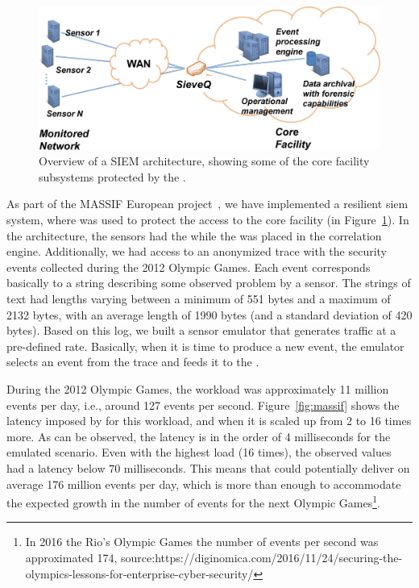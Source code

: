 \begin{figure}[!h]
\centering
\includegraphics[width=0.65\columnwidth]{images/images/SIEM.pdf}
\caption{Overview of a SIEM architecture, showing some of the core facility subsystems protected by the \sieveq.}
\label{fig:siem}
\end{figure}


As part of the MASSIF European project~\cite{Vianello:2013}, we have implemented a resilient \gls{siem} system, where \sieveq was used to protect the access to the core facility (in Figure~\ref{fig:siem}).
In the \sieveq architecture, the sensors had the \sender while the \postsieve was placed in the correlation engine.
Additionally, we had access to an anonymized trace with the security events collected during the 2012 Olympic Games.
Each event corresponds basically to a string describing some observed problem by a sensor. The strings of text had lengths varying between a minimum of 551 bytes and a maximum of 2132 bytes, with an average length of 1990 bytes (and a standard deviation of 420 bytes). Based on this log, we built a sensor emulator that generates traffic at a pre-defined rate. Basically, when it is time to produce a new event, the emulator selects an event from the trace and feeds it to the \sender.

During the 2012 Olympic Games, the workload was approximately 11 million events per day, i.e., around 127 events per second.
Figure~\ref{fig:massif} shows the latency imposed by \sieveq for this workload, and when it is scaled up from 2 to 16 times more. 
As can be observed, the latency is in the order of 4 milliseconds for the emulated scenario.
Even with the highest load (16 times), the observed values had a latency below $70$ milliseconds.
This means that \sieveq could potentially deliver on average 176 million events per day, which is more than enough to accommodate the expected growth in the number of events for the next Olympic Games\footnote{In 2016 the Rio's Olympic Games the number of events per second was approximated 174, source:https://diginomica.com/2016/11/24/securing-the-olympics-lessons-for-enterprise-cyber-security/}.

